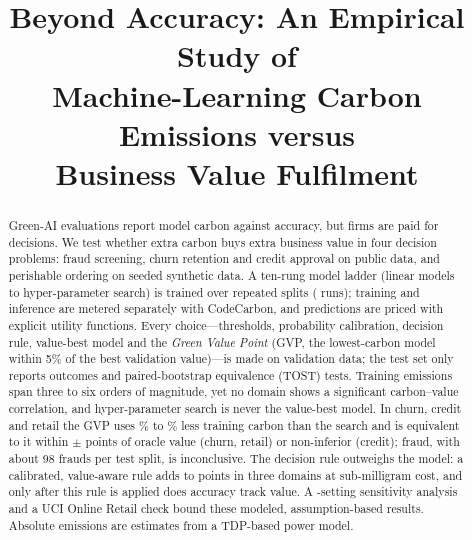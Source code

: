 \documentclass[conference]{IEEEtran}
\begin{document}
\title{Beyond Accuracy: An Empirical Study of\\ Machine-Learning Carbon Emissions versus\\ Business Value Fulfilment}

\author{
}

\maketitle

\begin{abstract}
Green-AI evaluations report model carbon against accuracy, but firms are paid for decisions. We test whether extra
carbon buys extra business value in four decision problems: fraud screening, churn retention and credit approval on
public data, and perishable ordering on seeded synthetic data. A ten-rung model ladder (linear models to
hyper-parameter search) is trained over repeated splits (\NRuns{} runs); training and inference are metered separately
with CodeCarbon, and predictions are priced with explicit utility functions. Every choice---thresholds, probability
calibration, decision rule, value-best model and the \emph{Green Value Point} (GVP, the lowest-carbon model within 5\%
of the best validation value)---is made on validation data; the test set only reports outcomes and paired-bootstrap
equivalence (TOST) tests. Training emissions span three to six orders of magnitude, yet no domain shows a significant
carbon--value correlation, and hyper-parameter search is never the value-best model. In churn, credit and retail the
GVP uses \CreditSaveHpo\% to \ChurnSaveHpo\% less training carbon than the search and is equivalent to it within
$\pm$\EqMargin{} points of oracle value (churn, retail) or non-inferior (credit); fraud, with about 98 frauds per test
split, is inconclusive. The
decision rule outweighs the model: a calibrated, value-aware rule adds \ChurnDecGain{} to \CreditDecGain{} points in
three domains at sub-milligram cost, and only after this rule is applied does accuracy track value. A
\SensN{}-setting sensitivity analysis and a UCI Online Retail check bound these modeled, assumption-based results.
Absolute emissions are estimates from a TDP-based power model.
\end{abstract}
\end{document}

